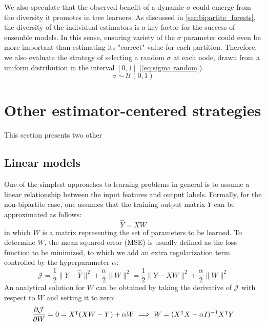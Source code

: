 We also speculate that the observed benefit of a dynamic $\sigma$ could emerge from the diversity it promotes in tree learners. As discussed in \autoref{sec:bipartite_forests}, the diversity of the individual estimators is a key factor for the success of ensemble models. In this sense, ensuring variety of the $\sigma$ parameter could even be more important than estimating its "correct" value for each partition. Therefore, we also evaluate the strategy of selecting a random $\sigma$ at each node, drawn from a uniform distribution in the interval $[0, 1]$ (\autoref{eq:sigma random}).
%
\begin{equation}
    \sigma \sim \mathcal{U}(0, 1)
    \label{eq:sigma random}
\end{equation}


\section{Other estimator-centered strategies}
\label{sec:learner centered}

This section presents two other 

\subsection{Linear models}
\label{sec:linear_models}

One of the simplest approaches to learning problems in general is to assume a linear relationship between the input features and output labels. Formally, for the non-bipartite case, one assumes that the training output matrix $Y$ can be approximated as follows:
%
\begin{equation}
    \hat Y = X W
\end{equation}
%
in which $W$ is a matrix representing the set of parameters to be learned. To determine $W$, the mean squared error (MSE) is usually defined as the loss function to be minimized, to which we add an extra regularization term controlled by the hyperparameter $\alpha$:
%
\begin{equation}
    \mathcal{J} = \frac{1}{2} \|Y - \hat Y\|^2 + \frac{\alpha}{2} \|W\|^2
    = \frac{1}{2} \|Y - XW\|^2 + \frac{\alpha}{2} \|W\|^2
\end{equation}
%
An analytical solution for $W$ can be obtained by taking the derivative of $\mathcal{J}$ with respect to $W$ and setting it to zero:
%
\begin{equation} %
    \frac{\partial \mathcal{J}}{\partial W} = 0
    = X\T (XW - Y) + \alpha W
    \implies W = (X\T X + \alpha I)^{-1} X\T Y
\end{equation}

